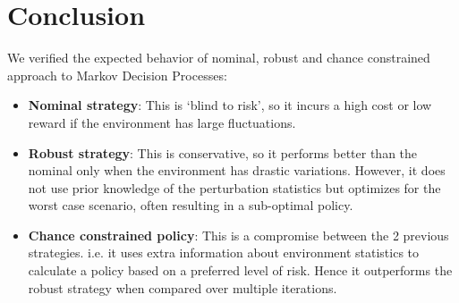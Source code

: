 \documentclass[11pt,reqno]{amsart}
\theoremstyle{definition}
\numberwithin{equation}{section}
\theoremstyle{remark}
\begin{document}
\section{Conclusion}
We verified the expected behavior of nominal, robust and chance constrained approach to Markov Decision Processes:
\begin{itemize}
\item \textbf{Nominal strategy}: This is `blind to risk', so it incurs a high cost or low reward if the environment has large fluctuations.

\item \textbf{Robust strategy}: This is conservative, so it performs better than the nominal only when the environment has drastic variations. However, it does not use prior knowledge of the perturbation statistics but optimizes for the worst case scenario, often resulting in a sub-optimal policy.

\item \textbf{Chance constrained policy}: This is a compromise between the 2 previous strategies. i.e. it uses extra information about environment statistics to calculate a policy based on a preferred level of risk. Hence it outperforms the robust strategy when compared over multiple iterations.
\end{itemize}





\end{document}
